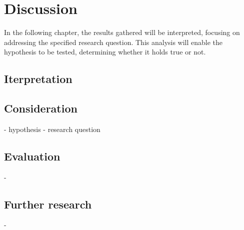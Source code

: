 \section{Discussion}
In the following chapter, the results gathered will be interpreted, focusing on addressing the specified research question. This analysis will enable the hypothesis to be tested, determining whether it holds true or not.

\subsection{Iterpretation}


\subsection{Consideration}
- hypothesis 
- research question 

\subsection{Evaluation}
-

\subsection{Further research}
- 



